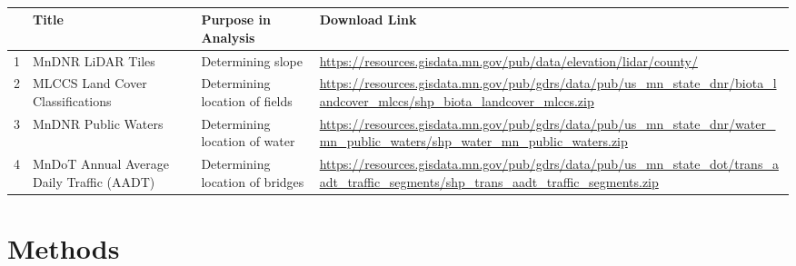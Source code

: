 \documentclass[article,12pt]{article}
\numberwithin{equation}{section}
\begin{document}
\begin{adjustwidth}{-.3in}{-.3in}
\begin{multicols}{2}

\\

{
	\scriptsize
	\begin{tabular}{|l|p{.17\linewidth}|p{.18\linewidth}|p{.52\linewidth}|}
	& \textbf{Title}                              & \textbf{Purpose in Analysis}     & \textbf{Download Link} \\ \hline
	1 & MnDNR LiDAR Tiles & Determining slope & \url{https://resources.gisdata.mn.gov/pub/data/elevation/lidar/county/}  \newline      \\                 
	2 & MLCCS Land Cover Classifications     & Determining location of fields & \url{https://resources.gisdata.mn.gov/pub/gdrs/data/pub/us_mn_state_dnr/biota_landcover_mlccs/shp_biota_landcover_mlccs.zip} \newline \\
	3 & MnDNR Public Waters & Determining location of water & \url{https://resources.gisdata.mn.gov/pub/gdrs/data/pub/us_mn_state_dnr/water_mn_public_waters/shp_water_mn_public_waters.zip} \newline       \\                 
	4 & MnDoT Annual Average Daily Traffic (AADT)     & Determining location of bridges & \url{https://resources.gisdata.mn.gov/pub/gdrs/data/pub/us_mn_state_dot/trans_aadt_traffic_segments/shp_trans_aadt_traffic_segments.zip}                                                         
\end{tabular}
}
\end{multicols}

\section{Methods}
\end{adjustwidth}
\end{document}
